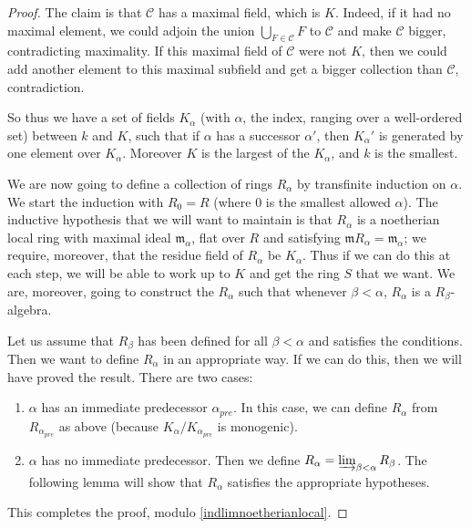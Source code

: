 \begin{proof}
The claim is that $\mathcal{C}$ has a maximal field, which is $K$. Indeed, if
it had no maximal element, we could adjoin the union $\bigcup_{F \in
\mathcal{C}} F$ to $\mathcal{C}$ and make $\mathcal{C}$ bigger, contradicting
maximality. If this maximal field of $\mathcal{C}$ were not $K$, then we could add another
element to this maximal subfield and get a bigger collection than
$\mathcal{C}$, contradiction.

So thus we have a  set of fields $K_\alpha$ (with $\alpha$, the
index, ranging over a well-ordered set) between $k$ and $K$,
such that if $\alpha$ has a successor $\alpha'$, then 
$K_\alpha'$ is generated by one element over $K_\alpha$. Moreover $K$ is the
largest of the $K_\alpha$, and $k$ is the smallest. 

We are now going to define a collection of rings $R_\alpha$ by transfinite
induction on $\alpha$. We start the induction with $R_0 = R$ (where $0$ is the
smallest allowed $\alpha$). The inductive hypothesis that we will want to
maintain is that $R_\alpha$ is a noetherian local ring with maximal ideal
$\mathfrak{m}_\alpha$, flat over $R$ and
satisfying $\mathfrak{m} R_\alpha = \mathfrak{m}_\alpha$; we require,
moreover, that the residue field of $R_\alpha$ be $K_\alpha$. Thus if we can
do this at each step, we will be able to work up to $K$ and get the ring $S$
that we want. 
We are, moreover, going to construct the $R_\alpha$ such that whenever $\beta <
\alpha$, $R_\alpha$ is a $R_\beta$-algebra.

Let us assume that $R_\beta$ has been defined for all $\beta < \alpha$ and
satisfies the conditions. Then
we want to define $R_\alpha$ in an appropriate way. If we can do this, then we
will have proved the result. 
There are two cases:
\begin{enumerate}
\item $\alpha$ has an immediate predecessor $\alpha_{pre} $. In this case, we
can define $R_\alpha$ from $R_{\alpha_{pre}}$ as above (because
$K_\alpha/K_{\alpha_{pre}}$ is monogenic).
\item $\alpha$ has no immediate predecessor. Then we define $R_\alpha =
\varinjlim_{\beta < \alpha} R_\beta$. The following lemma will show that
$R_\alpha$ satisfies the appropriate hypotheses.
\end{enumerate}
This completes the proof, modulo \cref{indlimnoetherianlocal}.
\end{proof} 

